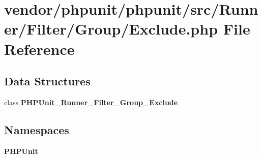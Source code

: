 \section{vendor/phpunit/phpunit/src/\+Runner/\+Filter/\+Group/\+Exclude.php File Reference}
\label{_exclude_8php}
\subsection*{Data Structures}
\begin{DoxyCompactItemize}
\item 
class {\bf P\+H\+P\+Unit\+\_\+\+Runner\+\_\+\+Filter\+\_\+\+Group\+\_\+\+Exclude}
\end{DoxyCompactItemize}
\subsection*{Namespaces}
\begin{DoxyCompactItemize}
\item 
 {\bf P\+H\+P\+Unit}
\end{DoxyCompactItemize}
